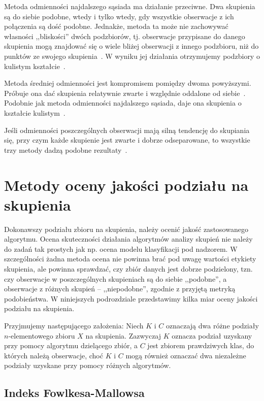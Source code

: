 \documentclass{praca1}
\begin{document}
Metoda odmienności najdalszego sąsiada ma działanie przeciwne. Dwa skupienia są do siebie podobne, wtedy i tylko wtedy, gdy wszystkie obserwacje z ich połączenia są dość podobne. Jednakże, metoda ta może nie zachowywać własności ,,bliskości'' dwóch podzbiorów, tj. obserwacje przypisane do danego skupienia mogą znajdować się o wiele bliżej obserwacji z innego podzbioru, niż do punktów ze swojego skupienia~\cite{Hastie2009:elements}. W wyniku jej działania otrzymujemy podzbiory o kulistym kształcie~\cite{Koronacki2005:statystyczne}.

Metoda średniej odmienności jest kompromisem pomiędzy dwoma powyższymi. Próbuje ona dać skupienia relatywnie zwarte i względnie oddalone od siebie~\cite{Hastie2009:elements}. Podobnie jak metoda odmienności najdalszego sąsiada, daje ona skupienia o kształcie kulistym~\cite{Koronacki2005:statystyczne}.

Jeśli odmienności poszczególnych obserwacji mają silną tendencję do skupiania się, przy czym każde skupienie jest zwarte i dobrze odseparowane, to wszystkie trzy metody dadzą podobne rezultaty~\cite{Hastie2009:elements}.



\section{Metody oceny jakości podziału na skupienia}	

Dokonawszy podziału zbioru na skupienia, należy ocenić jakość zastosowanego algorytmu. Ocena skuteczności działania algorytmów analizy skupień nie należy do zadań tak prostych jak np. ocena modelu klasyfikacji pod nadzorem. W szczególności żadna metoda ocena nie powinna brać pod uwagę wartości etykiety skupienia, ale powinna sprawdzać, czy zbiór danych jest dobrze podzielony, tzn. czy obserwacje w poszczególnych skupieniach są do siebie ,,podobne'', a obserwacje z różnych skupień -- ,,niepodobne'', zgodnie z przyjętą metryką podobieństwa. W niniejszych podrozdziale przedstawimy kilka miar oceny jakości podziału na skupienia.

Przyjmujemy następującego założenia: Niech $K$ i $C$ oznaczają dwa różne podziały $n$-elementowego zbioru $X$ na skupienia. Zazwyczaj $K$ oznacza podział uzyskany przy pomocy algorytmu dzielącego zbiór, a $C$ jest zbiorem prawdziwych klas, do których należą obserwacje, choć $K$ i $C$ mogą również oznaczać dwa niezależne podziały uzyskane przy pomocy różnych algorytmów.

\subsection{Indeks Fowlkesa-Mallowsa}
\end{document}
